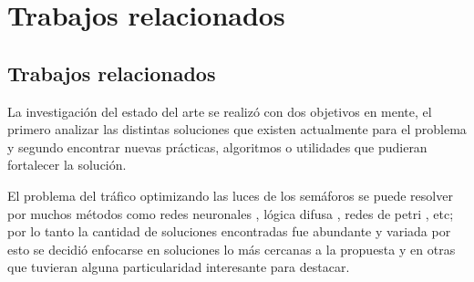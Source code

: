 \chapter{Trabajos relacionados}




\section{Trabajos relacionados}
La investigación del estado del arte se realizó con dos objetivos en mente, el primero analizar las distintas soluciones que existen actualmente para el problema y segundo encontrar nuevas prácticas, algoritmos o utilidades que pudieran fortalecer la solución.

El problema del tráfico optimizando las luces de los semáforos se puede resolver por muchos métodos como  redes neuronales \citep{Lopez1999}, lógica difusa \citep{Lim2001}, redes de petri \citep{DiFebbraro2002}, etc; por lo tanto la cantidad de soluciones encontradas fue abundante y variada por esto se decidió enfocarse en soluciones lo más cercanas a la propuesta y en otras que tuvieran alguna particularidad interesante para destacar.


